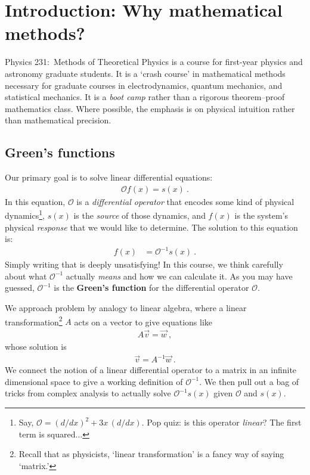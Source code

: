 
\section{Introduction: Why mathematical methods?}

Physics 231:~Methods of Theoretical Physics is a course for first-year physics and astronomy graduate students. It is a `crash course’ in mathematical methods necessary for graduate courses in electrodynamics, quantum mechanics, and statistical mechanics. It is a \emph{boot camp} rather than a rigorous theorem--proof mathematics class. Where possible, the emphasis is on physical intuition rather than mathematical precision. 

\subsection{Green’s functions}

Our primary goal is to solve linear differential equations:
\begin{align}
  \mathcal O f(x) = s(x) \ .
\end{align}
In this equation, $\mathcal O$ is a \emph{differential operator} that encodes some kind of physical dynamics\footnote{Say, $\mathcal O = (d/dx)^2 + 3x\,(d/dx)$. Pop quiz: is this operator \emph{linear}? The first term is squared...}, $s(x)$ is the \emph{source} of those dynamics, and $f(x)$ is the system's physical \emph{response} that we would like to determine. The solution to this equation is:
\begin{align}
  f(x) &= \mathcal O^{-1} s(x) \ .
\end{align}
Simply writing that is deeply unsatisfying! %
In this course, we think carefully about what $\mathcal O^{-1}$ actually \emph{means} and how we can calculate it. As you may have guessed, $\mathcal O^{-1}$ is the \textbf{Green's function} for the differential operator $\mathcal O$. 

We approach problem by analogy to linear algebra, where a linear transformation\footnote{Recall that as physicists, `linear transformation' is a fancy way of saying `matrix.'} $A$ acts on a vector to give equations like
\begin{align}
  A \vec{v} = \vec{w} \ ,
\end{align}
whose solution is
\begin{align}
  \vec{v} = A^{-1} \vec{w} \ .
\end{align}
We connect the notion of a linear differential operator to a matrix in an infinite dimensional space to give a working definition of $\mathcal O^{-1}$. We then pull out a bag of tricks from complex analysis to actually solve $\mathcal O^{-1}s(x)$ given $\mathcal O$ and $s(x)$. 

